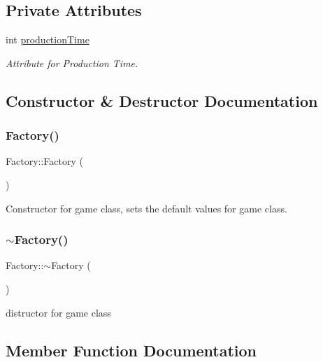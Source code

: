 \subsection*{Private Attributes}
\begin{DoxyCompactItemize}
\item 
int \hyperlink{class_factory_ab3a36b3ceb997d9e3fcc534c45fef354}{production\+Time}
\begin{DoxyCompactList}\small\item\em Attribute for Production Time. \end{DoxyCompactList}\end{DoxyCompactItemize}


\subsection{Constructor \& Destructor Documentation}
\mbox{\label{class_factory_ac792bf88cfb7b6804b479529da5308cc}} 
\subsubsection{\texorpdfstring{Factory()}{Factory()}}
{\footnotesize\ttfamily Factory\+::\+Factory (\begin{DoxyParamCaption}{ }\end{DoxyParamCaption})}



Constructor for game class, sets the default values for game class. 

\mbox{\label{class_factory_a8f71456f48e4df402c778a44191ff40e}} 
\subsubsection{\texorpdfstring{$\sim$\+Factory()}{~Factory()}}
{\footnotesize\ttfamily Factory\+::$\sim$\+Factory (\begin{DoxyParamCaption}{ }\end{DoxyParamCaption})}



distructor for game class 



\subsection{Member Function Documentation}
\mbox{\label{class_factory_a7020f06a3b9045d0902cd3740796ded5}} 
